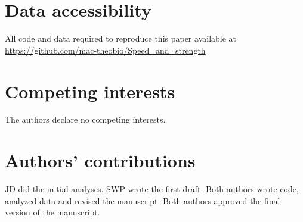 \documentclass[12pt]{article}
\begin{document}


\section*{Data accessibility}

All code and data required to reproduce this paper available at \url{https://github.com/mac-theobio/Speed_and_strength}

\section*{Competing interests}

The authors declare no competing interests.

\section*{Authors’ contributions}

JD did the initial analyses. SWP wrote the first draft. Both authors wrote code, analyzed data and revised the manuscript. Both authors approved the final version of the manuscript.
\end{document}
